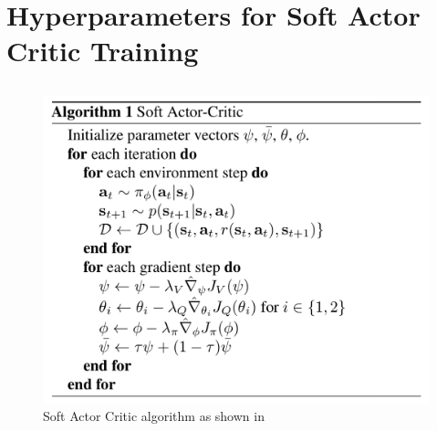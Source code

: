 \section{Hyperparameters for Soft Actor Critic Training}
\subsection{}
  \begin{figure}[H]
      \centering
      \includegraphics[width=1\textwidth]{figures/external/sac_algorithm.png}
      \caption{Soft Actor Critic algorithm as shown in \cite{haarnoja2018soft}}
      \label{fig:}
  \end{figure}



